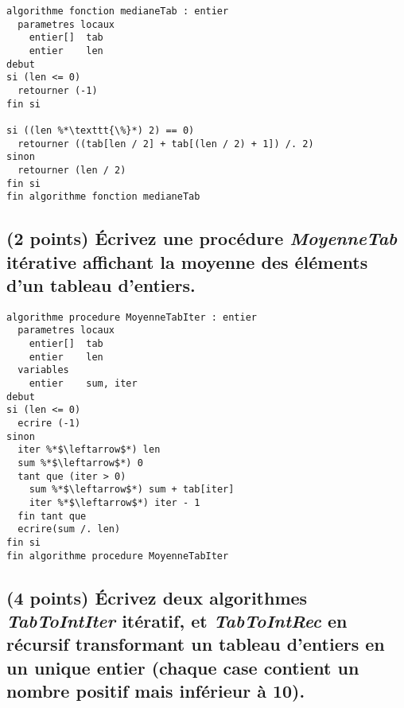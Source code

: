 \documentclass[11pt,a4paper]{article}
\begin{document}
\begin{center}

\begin{lstlisting}[style=algorithmique]
algorithme fonction medianeTab : entier
  parametres locaux
    entier[]  tab
    entier    len
debut
si (len <= 0)
  retourner (-1)
fin si

si ((len %*\texttt{\%}*) 2) == 0)
  retourner ((tab[len / 2] + tab[(len / 2) + 1]) /. 2)
sinon
  retourner (len / 2)
fin si
fin algorithme fonction medianeTab \end{lstlisting}

\end{center}



\vfillLast
\newpage
\vfillFirst


\subsection{(2 points) \'Ecrivez une procédure \og \textit{MoyenneTab} \fg{} itérative affichant la moyenne des éléments d'un tableau d'entiers. }

\bigskip

\begin{center}

\begin{lstlisting}[style=algorithmique]
algorithme procedure MoyenneTabIter : entier
  parametres locaux
    entier[]  tab
    entier    len
  variables
    entier    sum, iter
debut
si (len <= 0)
  ecrire (-1)
sinon
  iter %*$\leftarrow$*) len
  sum %*$\leftarrow$*) 0
  tant que (iter > 0)
    sum %*$\leftarrow$*) sum + tab[iter]
    iter %*$\leftarrow$*) iter - 1
  fin tant que
  ecrire(sum /. len)
fin si
fin algorithme procedure MoyenneTabIter \end{lstlisting}

\end{center}



\vfillLast
\newpage

\subsection{(4 points) \'Ecrivez deux algorithmes \og \textit{TabToIntIter} \fg{} itératif, et \og \textit{TabToIntRec} \fg{} en récursif transformant un tableau d'entiers en un unique entier (chaque case contient un nombre positif mais inférieur à 10). }
\end{document}
